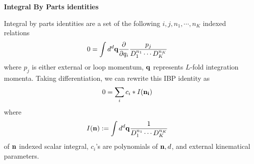 \documentclass[10pt]{article}
\begin{document}
\textbf{Integral By Parts identities}

Integral by parts identities are a set of the following $i,j, n_1,\cdots, n_K$ indexed relations
\begin{eqnarray}
\nonumber
0 = \int d^d \bold{q} \frac{\partial }{\partial q_i} \frac{p_j}{D_1^{n_1} \cdots D_K^{n_K}} 
\end{eqnarray}
where $p_j$ is either external or loop momentum, $\bold{q}$ represents $L$-fold integration momenta.
Taking differentiation, we can rewrite this IBP identity as
\begin{eqnarray}
\nonumber
0 = \sum_i c_i * I(\bold{n_i})
\end{eqnarray}
where
\begin{eqnarray}
\nonumber
I(\bold{n}) := \int d^d \bold{q}\frac{1}{D_1^{n_1} \cdots D_K^{n_K}} 
\end{eqnarray}
of $\bold{n}$ indexed scalar integral, $c_i$'s are polynomials of $\bold{n}, d$, and external kinematical parameters.
\end{document}
